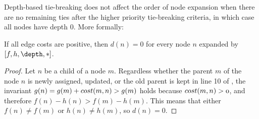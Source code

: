 

Depth-based tie-breaking does not affect the order of node expansion when there are no remaining ties after the
higher priority tie-breaking criteria, in which case all nodes have depth 0.
More formally:



\begin{lemma} 
 \label{lemma:depth0}
  If all edge costs are positive, then
  $d(n) = 0$ for every node $n$ expanded by \astar $[f,h,\depth,*]$.
\end{lemma}
\begin{proof}
Let $n$ be a child of a node $m$.
Regardless whether the parent $m$ of the node $n$ is newly assigned, updated, or the old parent is kept in line 10 of ,
the invariant $g(n)=g(m)+\mit{cost}(m,n) > g(m)$ holds
because $\mit{cost}(m,n)>0$,
and therefore $f(n)-h(n) > f(m)-h(m)$.
This means that either $f(n)\not=f(m)$ or $h(n)\not=h(m)$, so $d(n) = 0$.
\end{proof}


